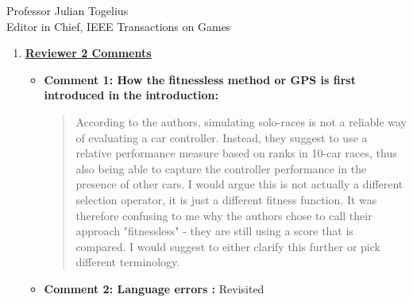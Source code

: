 \documentclass[10pt]{letter} %
\begin{document}
\begin{letter}{Professor Julian Togelius \\ Editor in Chief, IEEE Transactions on Games}
\begin{enumerate}
\begin{itemize}
		We have added this text to the paper in order to clarify what we
		understand by fitnessless:
		{\em Although this selection uses a score that could be assimilated to a fitness, it's actually an extension of a tournament selection policy since it creates tournaments of several individuals, and ``scores'' them according to how they fare in these races. This is not actually a fitness, since it's not intrinsic to the individual. It's equivalent to, in a $n$-tournament selection that is repeated several times, giving a score of $n$ to the first, $n-1$ to the second, and then using this for selection. That score is, thus, not a fitness but actually a way of keeping track of the position of the individual in the different tournaments it's participated.}
		\item {\bf Comment 2:Typos and Grammar errors:}
		\item {\bf Response:} We thank the reviewer for mentioning these errors which we fixed now. 
		\item {\bf Comment 3:Presentation Style about the linebreak of the word CG-Track 1 and sorting the Tables values.}
		\item {\bf Response:} Thank you so much for catching these glaring and confusing presentation style errors, which we have now corrected.
              \end{itemize}




\item {\bf \underline{ Reviewer 2 Comments}}\\
	\begin{itemize}
		\item {\bf  Comment 1:  How the fitnessless method or GPS is first introduced in the introduction:\\
			                \begin{quote}
				According to the authors, simulating solo-races is
				not a reliable way of evaluating a car
				controller. Instead, they suggest to use a relative
				performance measure based on ranks in 10-car races,
				thus also being able to capture the controller
				performance in the presence of other cars. I would
				argue this is not actually a different selection
				operator, it is just a different fitness function. It
				was therefore confusing to me why the authors chose
				to call their approach "fitnessless" - they are still
				using a score that is compared. I would suggest to
				either clarify this further or pick different
				terminology.
			\end{quote}}
		\item {\bf  Comment 2: Language errors :} Revisited


\end{itemize}
\end{enumerate}
\end{letter}
\end{document}
